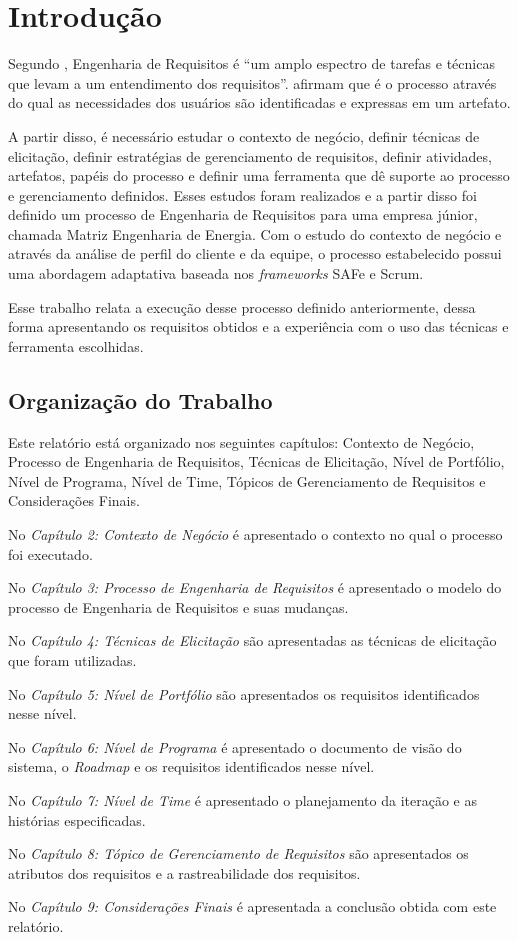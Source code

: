 \chapter[Introdução]{Introdução}

Segundo , Engenharia de Requisitos é ``um amplo
espectro de tarefas e técnicas que levam a um entendimento dos requisitos''.
 afirmam que é o processo através do qual as necessidades dos usuários 
são identificadas e expressas em um artefato.

A partir disso, é necessário estudar o contexto de negócio, definir técnicas de elicitação, 
definir estratégias de gerenciamento de requisitos, definir atividades, artefatos, papéis do processo
e definir uma ferramenta que dê suporte ao processo e gerenciamento definidos.
Esses estudos foram realizados e a partir disso foi definido um processo de Engenharia de Requisitos para uma empresa júnior, 
chamada Matriz Engenharia de Energia. Com o estudo do contexto de negócio e através da análise de perfil do cliente e da equipe, o processo
estabelecido possui uma abordagem adaptativa baseada nos \textit{frameworks} SAFe e Scrum. 

Esse trabalho relata a execução desse processo definido anteriormente, dessa forma apresentando os requisitos obtidos e 
a experiência com o uso das técnicas e ferramenta escolhidas.

\section{Organização do Trabalho}

Este relatório está organizado nos seguintes capítulos: Contexto de Negócio, Processo de Engenharia de Requisitos, Técnicas de Elicitação,
Nível de Portfólio, Nível de Programa, Nível de Time, Tópicos de Gerenciamento de Requisitos e Considerações Finais.

No \textit{Capítulo 2: Contexto de Negócio} é apresentado o contexto no qual o processo foi executado.

No \textit{Capítulo 3: Processo de Engenharia de Requisitos} é apresentado o modelo do processo de Engenharia de Requisitos e suas mudanças.

No \textit{Capítulo 4: Técnicas de Elicitação} são apresentadas as técnicas de elicitação que foram utilizadas.

No \textit{Capítulo 5: Nível de Portfólio} são apresentados os requisitos identificados nesse nível.

No \textit{Capítulo 6: Nível de Programa} é apresentado o documento de visão do sistema, o \textit{Roadmap} e os requisitos identificados
nesse nível.

No \textit{Capítulo 7: Nível de Time} é apresentado o planejamento da iteração e as histórias especificadas.

No \textit{Capítulo 8: Tópico de Gerenciamento de Requisitos} são apresentados os atributos dos requisitos e a rastreabilidade dos requisitos.

No \textit{Capítulo 9: Considerações Finais} é apresentada a conclusão obtida
com este relatório.